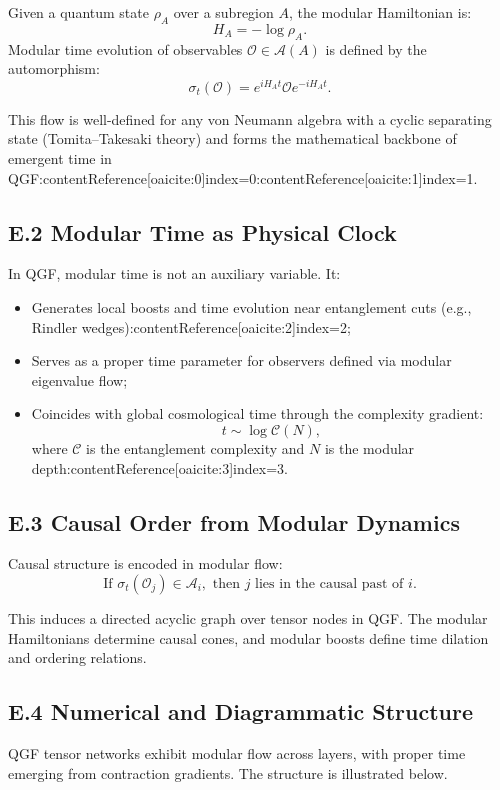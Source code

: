 \documentclass[11pt]{article}
\begin{document}
Given a quantum state \( \rho_A \) over a subregion \( A \), the modular Hamiltonian is:
\[
H_A = -\log \rho_A.
\]
Modular time evolution of observables \( \mathcal{O} \in \mathcal{A}(A) \) is defined by the automorphism:
\[
\sigma_t(\mathcal{O}) = e^{i H_A t} \mathcal{O} e^{-i H_A t}.
\]

This flow is well-defined for any von Neumann algebra with a cyclic separating state (Tomita–Takesaki theory) and forms the mathematical backbone of emergent time in QGF:contentReference[oaicite:0]{index=0}:contentReference[oaicite:1]{index=1}.

\subsection*{E.2 Modular Time as Physical Clock}

In QGF, modular time is not an auxiliary variable. It:
\begin{itemize}
  \item Generates local boosts and time evolution near entanglement cuts (e.g., Rindler wedges):contentReference[oaicite:2]{index=2};
  \item Serves as a proper time parameter for observers defined via modular eigenvalue flow;
  \item Coincides with global cosmological time through the complexity gradient:
  \[
  t \sim \log \mathcal{C}(N),
  \]
  where \( \mathcal{C} \) is the entanglement complexity and \( N \) is the modular depth:contentReference[oaicite:3]{index=3}.
\end{itemize}

\subsection*{E.3 Causal Order from Modular Dynamics}

Causal structure is encoded in modular flow:
\[
\text{If } \sigma_t(\mathcal{O}_j) \in \mathcal{A}_i, \text{ then } j \text{ lies in the causal past of } i.
\]

This induces a directed acyclic graph over tensor nodes in QGF. The modular Hamiltonians determine causal cones, and modular boosts define time dilation and ordering relations.

\subsection*{E.4 Numerical and Diagrammatic Structure}

QGF tensor networks exhibit modular flow across layers, with proper time emerging from contraction gradients. The structure is illustrated below.
\end{document}
